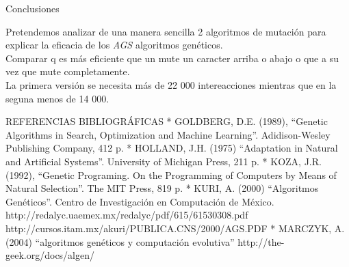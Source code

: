 \documentclass[11pt]{article}
\begin{document}
\begin{Verbatim}[commandchars=\\\{\}]
    \end{Verbatim}

    Conclusiones

Pretendemos analizar de una manera sencilla 2 algoritmos de mutación
para explicar la eficacia de los \emph{AGS} algoritmos genéticos.\\
Comparar q es más eficiente que un mute un caracter arriba o abajo o que
a su vez que mute completamente.\\
La primera versión se necesita más de 22 000 intereacciones mientras que
en la seguna menos de 14 000.

    REFERENCIAS BIBLIOGRÁFICAS * GOLDBERG, D.E. (1989), ``Genetic Algorithms
in Search, Optimization and Machine Learning''. Adidison-Wesley
Publishing Company, 412 p. * HOLLAND, J.H. (1975) ``Adaptation in
Natural and Artificial Systems''. University of Michigan Press, 211 p. *
KOZA, J.R. (1992), ``Genetic Programing. On the Programming of Computers
by Means of Natural Selection''. The MIT Press, 819 p. * KURI, A. (2000)
``Algoritmos Genéticos''. Centro de Investigación en Computación de
México. http://redalyc.uaemex.mx/redalyc/pdf/615/61530308.pdf
http://cursos.itam.mx/akuri/PUBLICA.CNS/2000/AGS.PDF * MARCZYK, A.
(2004) ``algoritmos genéticos y computación evolutiva'' http://the-
geek.org/docs/algen/


    
    
    
    
\end{document}

